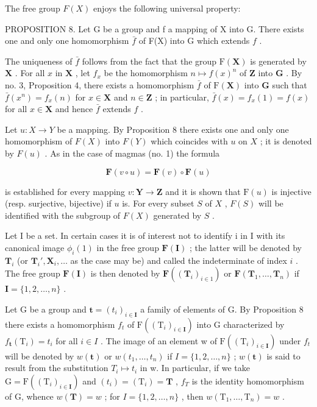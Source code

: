 The free group \(F(X)\) enjoys the following universal property:

PROPOSITION 8. Let G be a group and f a mapping of X into G. There exists one and only one homomorphism \(\bar{f}\) of F(X) into G which extends \(f\) .

The uniqueness of \(\bar{f}\) follows from the fact that the group \(\mathrm{F}(\mathbf{X})\) is generated by \(\mathbf{X}\) . For all \(x\) in \(\mathbf{X}\) , let \(f_x\) be the homomorphism \(n \mapsto f(x)^n\) of \(\mathbf{Z}\) into \(\mathbf{G}\) . By no. 3, Proposition 4, there exists a homomorphism \(\bar{f}\) of \(\mathrm{F}(\mathbf{X})\) into \(\mathbf{G}\) such that \(\bar{f}(x^n) = f_x(n)\) for \(x \in \mathbf{X}\) and \(n \in \mathbf{Z}\) ; in particular, \(\bar{f}(x) = f_x(1) = f(x)\) for all \(x \in \mathbf{X}\) and hence \(\bar{f}\) extends \(f\) .

Let \(u: X \to Y\) be a mapping. By Proposition 8 there exists one and only one homomorphism of \(F(X)\) into \(F(Y)\) which coincides with \(u\) on \(X\) ; it is denoted by \(F(u)\) . As in the case of magmas (no. 1) the formula

\[
\mathbf {F} (v \circ u) = \mathbf {F} (v) \circ \mathbf {F} (u)
\]

is established for every mapping \(v: \mathbf{Y} \to \mathbf{Z}\) and it is shown that \(\mathrm{F}(u)\) is injective (resp. surjective, bijective) if \(u\) is. For every subset \(S\) of \(X\) , \(F(S)\) will be identified with the subgroup of \(F(X)\) generated by \(S\) .

Let I be a set. In certain cases it is of interest not to identify i in I with its canonical image \(\phi_i(1)\) in the free group \(\mathbf{F}(\mathbf{I})\) ; the latter will be denoted by \(\mathbf{T}_i\) (or \(\mathbf{T}_i', \mathbf{X}_i, \ldots\) as the case may be) and called the indeterminate of index \(i\) . The free group \(\mathbf{F}(\mathbf{I})\) is then denoted by \(\mathbf{F}((\mathbf{T}_i)_{i \in 1})\) or \(\mathbf{F}(\mathbf{T}_1, \ldots, \mathbf{T}_n)\) if \(\mathbf{I} = \{1, 2, \ldots, n\}\) .

Let G be a group and \(\mathbf{t} = (t_{i})_{i \in \mathbf{I}}\) a family of elements of G. By Proposition 8 there exists a homomorphism \(f_{t}\) of \(\mathrm{F}((\mathrm{T}_{i})_{i \in \mathbf{I}})\) into G characterized by \(f_{\mathbf{t}}(\mathrm{T}_{i}) = t_{i}\) for all \(i \in I\) . The image of an element w of \(\mathrm{F}((\mathrm{T}_{i})_{i \in \mathbf{I}})\) under \(f_{t}\) will be denoted by \(w(\mathbf{t})\) or \(w(t_{1}, \ldots, t_{n})\) if \(I = \{1, 2, \ldots, n\}\) ; \(w(\mathbf{t})\) is said to result from the substitution \(T_{i} \mapsto t_{i}\) in w. In particular, if we take \(\mathrm{G} = \mathrm{F}((\mathrm{T}_{i})_{i \in \mathbf{I}})\) and \((t_{i}) = (\mathrm{T}_{i}) = \mathbf{T}\) , \(f_{T}\) is the identity homomorphism of G, whence \(w(\mathbf{T}) = w\) ; for \(I = \{1, 2, \ldots, n\}\) , then \(w(\mathrm{T}_{1}, \ldots, \mathrm{T}_{n}) = w\) .

